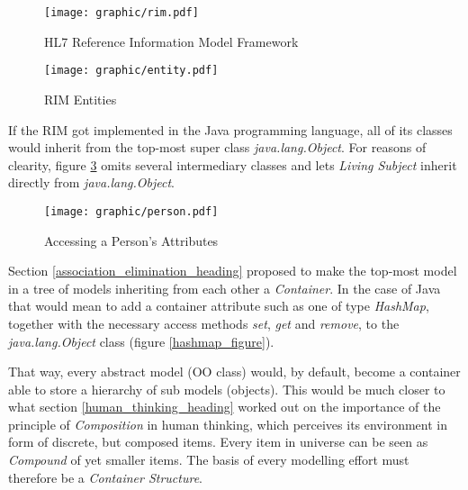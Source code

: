 \begin{figure}[ht]
    \begin{center}
        \texttt{[image: graphic/rim.pdf]}
        \caption{HL7 Reference Information Model Framework \cite{hl7}}
        \label{rim_figure}
    \end{center}
\end{figure}

\begin{figure}[ht]
    \begin{center}
        \texttt{[image: graphic/entity.pdf]}
        \caption{RIM Entities \cite{hl7}}
        \label{entity_figure}
    \end{center}
\end{figure}

\clearpage

If the RIM got implemented in the Java programming language, all of its classes
would inherit from the top-most super class \emph{java.lang.Object}. For reasons
of clearity, figure \ref{person_figure} omits several intermediary classes and
lets \emph{Living Subject} inherit directly from \emph{java.lang.Object}.

\begin{figure}[ht]
    \begin{center}
        \texttt{[image: graphic/person.pdf]}
        \caption{Accessing a Person's Attributes}
        \label{person_figure}
    \end{center}
\end{figure}

Section \ref{association_elimination_heading} proposed to make the top-most
model in a tree of models inheriting from each other a \emph{Container}. In the
case of Java that would mean to add a container attribute such as one of type
\emph{HashMap}, together with the necessary access methods \emph{set},
\emph{get} and \emph{remove}, to the \emph{java.lang.Object} class (figure
\ref{hashmap_figure}).

That way, every abstract model (OO class) would, by default, become a container
able to store a hierarchy of sub models (objects). This would be much closer to
what section \ref{human_thinking_heading} worked out on the importance of the
principle of \emph{Composition} in human thinking, which perceives its
environment in form of discrete, but composed items. Every item in universe can
be seen as \emph{Compound} of yet smaller items. The basis of every modelling
effort must therefore be a \emph{Container Structure}.

